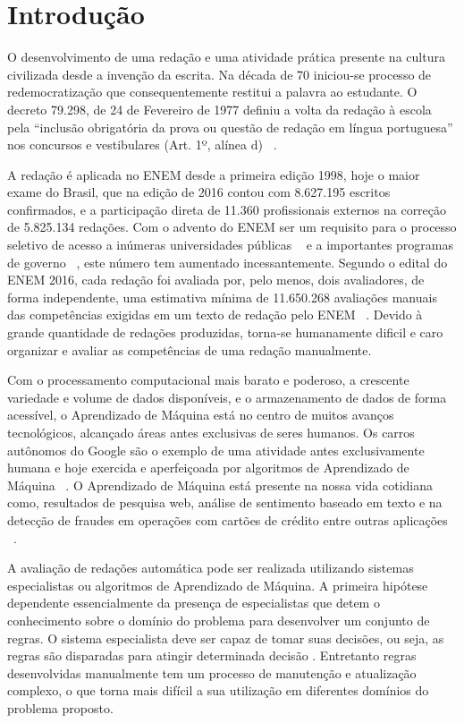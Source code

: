 \section{Introdução}
\noindent O desenvolvimento de uma redação e uma atividade prática presente na 
cultura civilizada desde a invenção da escrita. Na década de 70 iniciou-se 
processo de redemocratização que consequentemente restitui a palavra ao 
estudante. O decreto 79.298, de 24 de Fevereiro de 1977 definiu a volta da 
redação à escola pela ``inclusão obrigatória da prova ou questão de redação em 
língua portuguesa'' nos concursos e vestibulares (Art. 1º, alínea d) 
~\cite{lara:1995}.

A redação é aplicada no ENEM desde a primeira edição 1998, hoje o maior exame 
do Brasil, que na edição de 2016 contou com 8.627.195 escritos confirmados, e a 
participação direta de 11.360 profissionais externos na correção de 5.825.134 
redações. Com o advento do ENEM ser um requisito para o processo seletivo de 
acesso a inúmeras universidades públicas ~\cite{sisu:2017} e a importantes 
programas de governo ~\cite{csf:2017}, este número tem aumentado 
incessantemente. Segundo o edital do ENEM 2016, cada redação foi avaliada por, 
pelo menos, dois avaliadores, de forma independente, uma estimativa mínima de 
11.650.268 avaliações manuais das competências exigidas em um texto de redação 
pelo ENEM ~\cite{edital_enem:2016}. Devido à grande quantidade de redações 
produzidas, torna-se humanamente dificil e caro organizar e avaliar as 
competências de uma redação manualmente.

Com o processamento computacional mais barato e poderoso, a crescente variedade 
e volume de dados disponíveis, e o armazenamento de dados de forma acessível, 
o Aprendizado de Máquina está no centro de muitos avanços tecnológicos, 
alcançado áreas antes exclusivas de seres humanos. Os carros autônomos do 
Google são o exemplo de uma atividade antes exclusivamente humana e hoje 
exercida e aperfeiçoada por algoritmos de Aprendizado de Máquina 
~\cite{waymo:2017}. O Aprendizado de Máquina está presente na nossa vida 
cotidiana como, resultados de pesquisa web, análise de sentimento baseado em 
texto e na detecção de fraudes em operações com cartões de crédito entre outras 
aplicações ~\cite{batista1999aplicando}.

A avaliação de redações automática pode ser realizada utilizando sistemas
especialistas ou algoritmos de Aprendizado de Máquina. A primeira hipótese 
dependente essencialmente da presença de especialistas que detem o 
conhecimento sobre o domínio do problema para desenvolver um conjunto de 
regras. O sistema especialista deve ser capaz de tomar suas decisões, ou seja, 
as regras são disparadas para atingir determinada decisão 
\cite{negnevitsky2005artificial}. Entretanto regras desenvolvidas manualmente 
tem um processo de manutenção e atualização complexo, o que torna mais difícil 
a sua utilização em diferentes domínios do problema proposto.

